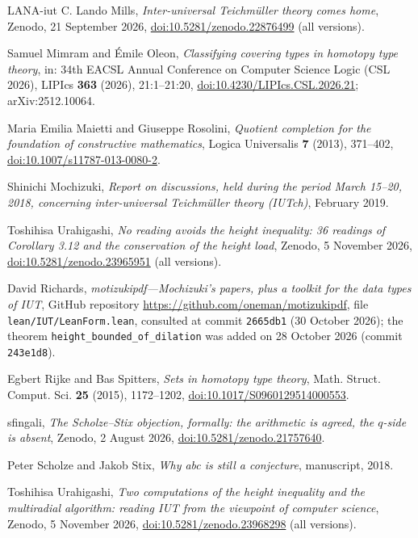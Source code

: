 \documentclass[11pt,a4paper]{article}
\theoremstyle{plain}
\theoremstyle{definition}
\theoremstyle{remark}
\begin{document}
\begin{thebibliography}{LANA-iut}
C. Lando Mills, \emph{Inter-universal {T}eichm\"uller theory comes home}, Zenodo, 21 September 2026,
\href{https://doi.org/10.5281/zenodo.22876499}{doi:10.5281/zenodo.22876499} (all versions).

Samuel Mimram and \'Emile Oleon, \emph{Classifying covering types in homotopy type theory}, in: 34th EACSL Annual Conference
on Computer Science Logic (CSL 2026), LIPIcs \textbf{363} (2026), 21:1--21:20,
\href{https://doi.org/10.4230/LIPIcs.CSL.2026.21}{doi:10.4230/LIPIcs.CSL.2026.21}; arXiv:2512.10064.

Maria Emilia Maietti and Giuseppe Rosolini, \emph{Quotient completion for the foundation of constructive mathematics},
Logica Universalis \textbf{7} (2013), 371--402, \href{https://doi.org/10.1007/s11787-013-0080-2}{doi:10.1007/s11787-013-0080-2}.

Shinichi Mochizuki, \emph{Report on discussions, held during the period March 15--20, 2018, concerning inter-universal
{T}eichm\"uller theory ({IUTch})}, February 2019.

Toshihisa Urahigashi, \emph{No reading avoids the height inequality: 36 readings of {C}orollary 3.12 and the
conservation of the height load}, Zenodo, 5 November 2026,
\href{https://doi.org/10.5281/zenodo.23965951}{doi:10.5281/zenodo.23965951} (all versions).

David Richards, \emph{motizukipdf---{M}ochizuki's papers, plus a toolkit for the data types of {IUT}}, GitHub
repository \url{https://github.com/oneman/motizukipdf}, file \texttt{lean/IUT/LeanForm.lean}, consulted at commit
\texttt{2665db1} (30 October 2026); the theorem \texttt{height\_bounded\_of\_dilation} was added on 28 October 2026
(commit \texttt{243e1d8}).

Egbert Rijke and Bas Spitters, \emph{Sets in homotopy type theory}, Math. Struct. Comput. Sci. \textbf{25} (2015),
1172--1202, \href{https://doi.org/10.1017/S0960129514000553}{doi:10.1017/S0960129514000553}.

sfingali, \emph{The {S}cholze--{S}tix objection, formally: the arithmetic is agreed, the $q$-side is absent}, Zenodo,
2 August 2026, \href{https://doi.org/10.5281/zenodo.21757640}{doi:10.5281/zenodo.21757640}.

Peter Scholze and Jakob Stix, \emph{Why abc is still a conjecture}, manuscript, 2018.

Toshihisa Urahigashi, \emph{Two computations of the height inequality and the multiradial algorithm: reading {IUT}
from the viewpoint of computer science}, Zenodo, 5 November 2026,
\href{https://doi.org/10.5281/zenodo.23968298}{doi:10.5281/zenodo.23968298} (all versions).


\end{thebibliography}
\end{document}
